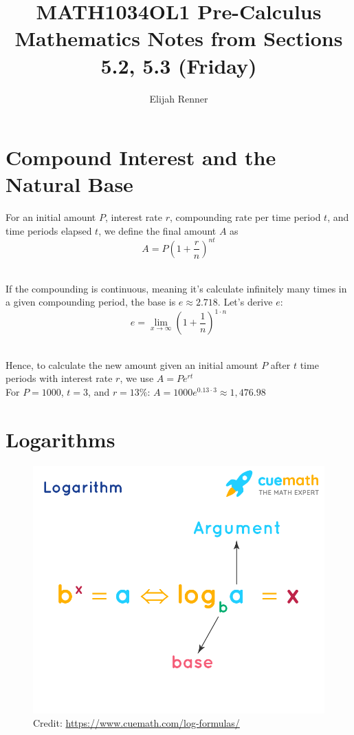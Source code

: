 \documentclass[12pt]{article}
\title{MATH1034OL1 Pre-Calculus Mathematics Notes from Sections 5.2, 5.3 (Friday)}
\author{Elijah Renner}
\begin{document}
\maketitle

\vspace{0.5in}

\tableofcontents

\section{Compound Interest and the Natural Base}

For an initial amount \(P\), interest rate \(r\), compounding rate per time period \(t\), and time periods elapsed \(t\), we define the final amount \(A\) as\\

\[A=P\left(1+\frac{r}{n}\right)^{nt}\]\

If the compounding is continuous, meaning it's calculate infinitely many times in a given compounding period, the base is \(e\approx2.718\). Let's derive \(e\):\\

\[e=\lim_{x\to \infty}\left(1+\frac{1}{n}\right)^{1\cdot n}\]\

Hence, to calculate the new amount given an initial amount \(P\) after \(t\) time periods with interest rate \(r\), we use \(A=Pe^{rt}\)\\

For \(P=1000\), \(t=3\), and \(r=13\%\): \(A=1000e^{0.13\cdot 3}\approx1,476.98\)\\

\section{Logarithms}

\begin{figure}[H]
	\centering
	\includegraphics[scale=0.6]{logs.png}
	\caption{Credit: \url{https://www.cuemath.com/log-formulas/}}
\end{figure}
\end{document}
